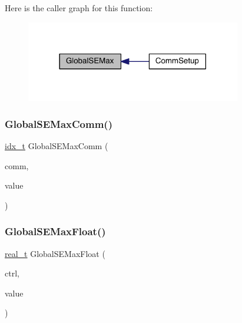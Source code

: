 Here is the caller graph for this function\+:\nopagebreak
\begin{figure}[H]
\begin{center}
\leavevmode
\includegraphics[width=266pt]{a00344_a51be32add0e43ecdac3f0b982a0733b4_icgraph}
\end{center}
\end{figure}
\mbox{\label{a00344_aa31576794c6d7b00495b4402a1a4814a}} 
\subsubsection{\texorpdfstring{Global\+S\+E\+Max\+Comm()}{GlobalSEMaxComm()}}
{\footnotesize\ttfamily \hyperlink{a00876_aaa5262be3e700770163401acb0150f52}{idx\+\_\+t} Global\+S\+E\+Max\+Comm (\begin{DoxyParamCaption}\item[{M\+P\+I\+\_\+\+Comm}]{comm,  }\item[{\hyperlink{a00876_aaa5262be3e700770163401acb0150f52}{idx\+\_\+t}}]{value }\end{DoxyParamCaption})}

\mbox{\label{a00344_ad62cb5f0c141a2535d0f6eca6588a1c5}} 
\subsubsection{\texorpdfstring{Global\+S\+E\+Max\+Float()}{GlobalSEMaxFloat()}}
{\footnotesize\ttfamily \hyperlink{a00876_a1924a4f6907cc3833213aba1f07fcbe9}{real\+\_\+t} Global\+S\+E\+Max\+Float (\begin{DoxyParamCaption}\item[{\hyperlink{a00742}{ctrl\+\_\+t} $\ast$}]{ctrl,  }\item[{\hyperlink{a00876_a1924a4f6907cc3833213aba1f07fcbe9}{real\+\_\+t}}]{value }\end{DoxyParamCaption})}

